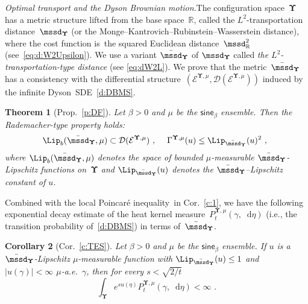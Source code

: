 \documentclass[11pt,letterpaper]{amsart}
\newcommand{\dom}[1]{\mathcal D(#1)}
\newcommand{\diff}{\mathop{}\!\mathrm{d}}
\newcommand{\R}{{\mathbb R}}
\newcommand{\comma}{\,\,\mathrm{,}\;\,}
\newcommand{\fstop}{\,\,\mathrm{.}}
\newcommand{\cdc}{\Gamma}
\newcommand{\QP}{{\mu}}
\newcommand{\dUpsilon}{{\mathbf \Upsilon}}
\newcommand{\U}{\dUpsilon}
\newcommand{\sine}{\mathsf{sine}}
\newcommand{\E}{\mathcal E}
\renewcommand{\1}{\mathbf 1}
\numberwithin{equation}{section}
\theoremstyle{plain}
\newtheorem{thm}{Theorem}[section]
\newtheorem{cor}[thm]{Corollary}%
\theoremstyle{definition}
\theoremstyle{remark}
\renewcommand{\paragraph}[1]{\medskip\emph{#1}.\quad}
\begin{document}
\paragraph{Optimal transport and the Dyson Brownian motion}The configuration space~$\U$ has a metric structure lifted from the base space~$\R$, called the $L^2$-transportation distance~$\mssd_\U$ (or the Monge--Kantrovich--Rubinstein--Wasserstein distance), where the cost function is~the squared Euclidean distance~$\mssd_\R^2$ (see~\eqref{eq:d:W2Upsilon}). We use a variant $\bar\mssd_\U$ of $\mssd_\U$ called {\it the $L^2$-transportation-type distance} (see \eqref{eq:dW2L}). We prove that the metric~$\bar\mssd_\U$ has a consistency with the differential structure~$(\E^{\U, \QP}, \dom{\E^{\U, \QP}})$ induced by the infinite Dyson~SDE~\eqref{d:DBMS}. 

\begin{thm}[Prop.~\ref{p:DF}] \label{t:1.5}
Let $\beta>0$ and $\QP$ be the $\sine_\beta$ ensemble.  Then the Rademacher-type property holds:
$$\Lip_b(\bar\mssd_\U, \QP) \subset \dom{\E^{\U, \QP}} \comma \quad \cdc^{\U, \QP}(u) \le \Lip_{\bar\mssd_\U}(u)^2 \comma$$
where $\Lip_b(\bar\mssd_\U, \QP)$ denotes the space of bounded $\QP$-measurable $\bar\mssd_\U$-Lipschitz functions on~$\U$ and $\Lip_{\bar\mssd_\U}(u)$ denotes the $\bar\mssd_\U$--Lipschitz constant of $u$.
 \end{thm}

Combined with the local Poincar\'e inequality~in Cor.~\ref{c:1}, we have the following exponential decay estimate of the heat kernel measure~$P_t^{\U, \QP}(\gamma, \diff \eta)$ (i.e., the transition probability of~\eqref{d:DBMS}) in terms of~$\bar\mssd_\U$.
\begin{cor}[Cor.~\ref{c:TES}] \label{c:3}
Let $\beta>0$ and $\QP$ be the $\sine_\beta$ ensemble.
If $u$ is a $\bar{\mssd}_\U$-Lipschitz $\QP$-measurable function with $\Lip_{\bar{\mssd}_\U}(u) \le 1$ and $|u(\gamma)|<\infty$ $\QP$-a.e.~$\gamma$, then for every $s<\sqrt{2/t}$
$$\int_{\U} e^{s u(\eta)} P_t^{\U, \QP}(\gamma, \diff \eta)<\infty \fstop$$
\end{cor}
\end{document}
